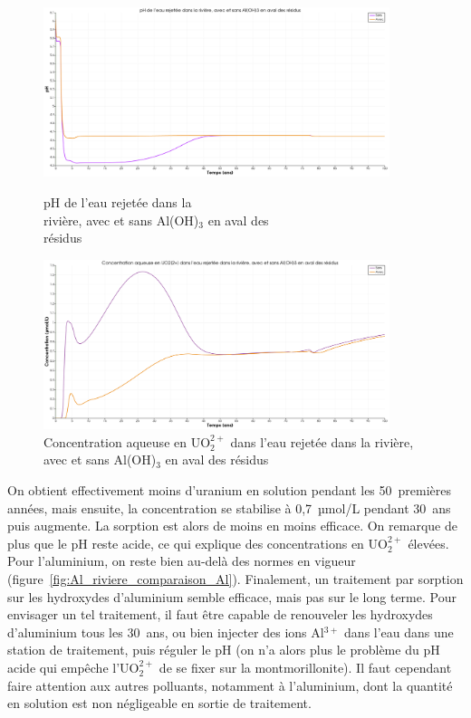 \documentclass{article}
\begin{document}
\begin{figure}[b]
    \centering
    \begin{minipage}{0.5\textwidth}
        \centering
        \includegraphics[width=0.9\textwidth]{III_B_2_22.png} 
        \caption{pH de l'eau rejetée dans la \\rivière, avec et sans Al(OH)$_3$ en aval des \\résidus}
        \label{fig:pH_riviere_comparaison_Al}
    \end{minipage}\hfill
    \begin{minipage}{0.5\textwidth}
        \centering
        \includegraphics[width=0.9\textwidth]{III_B_2_23.png} 
        \caption{Concentration aqueuse en UO$_2^{2+}$ dans l'eau rejetée dans la rivière, avec et sans Al(OH)$_3$ en aval des résidus}
        \label{fig:UO2_riviere_comparaison_Al}
    \end{minipage}
\end{figure}



On obtient effectivement moins d’uranium en solution pendant les 50~premières années, mais ensuite, la concentration se stabilise à 0,7~µmol/L pendant 30~ans puis augmente. La sorption est alors de moins en moins efficace. On remarque de plus que le pH reste acide, ce qui explique des concentrations en UO$_2^{2+}$ élevées. Pour l’aluminium, on reste bien au-delà des normes en vigueur (figure~\ref{fig:Al_riviere_comparaison_Al}).
Finalement, un traitement par sorption sur les hydroxydes d’aluminium semble efficace, mais pas sur le long terme. Pour envisager un tel traitement, il faut être capable de renouveler les hydroxydes d’aluminium tous les 30~ans, ou bien injecter des ions Al$^{3+}$ dans l’eau dans une station de traitement, puis réguler le pH (on n’a alors plus le problème du pH acide qui empêche l’UO$_2^{2+}$ de se fixer sur la montmorillonite). Il faut cependant faire attention aux autres polluants, notamment à l’aluminium, dont la quantité en solution est non négligeable en sortie de traitement.
\end{document}
